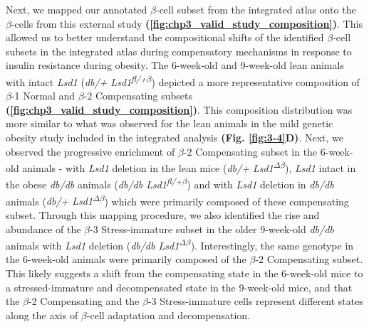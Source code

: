 Next, we mapped our annotated $\beta$-cell subset from the integrated atlas onto the $\beta$-cells from this external study \textbf{(\autoref{fig:chp3_valid_study_composition})}. This allowed us to better understand the compositional shifts of the identified $\beta$-cell subsets in the integrated atlas during compensatory mechanisms in response to insulin resistance during obesity. The 6-week-old and 9-week-old lean animals with intact \textit{Lsd1} (\textit{db/+ Lsd1\textsuperscript{fl/+$\beta$}}) depicted a more representative composition of $\beta$-1 Normal and $\beta$-2 Compensating subsets \textbf{(\autoref{fig:chp3_valid_study_composition})}. This composition distribution was more similar to what was observed for the lean animals in the mild genetic obesity study included in the integrated analysis \textbf{(Fig. \ref{fig:3-4}D)}. Next, we observed the progressive enrichment of $\beta$-2 Compensating subset in the 6-week-old animals - with \textit{Lsd1} deletion in the lean mice (\textit{db/+ Lsd1\textsuperscript{$\Delta\beta$}}), \textit{Lsd1} intact in the obese \textit{db/db} animals (\textit{db/db Lsd1\textsuperscript{fl/+$\beta$}})  and with \textit{Lsd1} deletion in \textit{db/db} animals (\textit{db/+ Lsd1\textsuperscript{$\Delta\beta$}})  which were primarily composed of these compensating subset. Through this mapping procedure, we also identified  the rise and abundance of the $\beta$-3 Stress-immature subset in the older 9-week-old \textit{db/db} animals with \textit{Lsd1} deletion (\textit{db/db Lsd1\textsuperscript{$\Delta\beta$}}). Interestingly, the same genotype in the 6-week-old animals were primarily composed of the $\beta$-2 Compensating subset. This likely suggests a shift from the compensating state in the 6-week-old mice to a stressed-immature and decompensated state in the 9-week-old mice, and that the $\beta$-2 Compensating and the $\beta$-3 Stress-immature cells represent different states along the axis of $\beta$-cell adaptation and decompensation.\\

